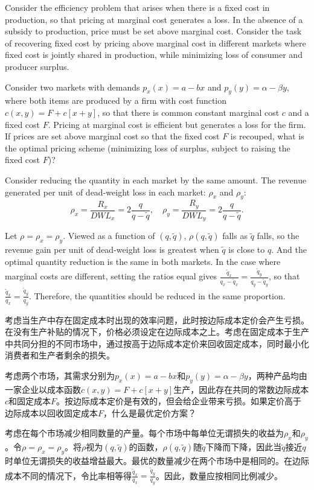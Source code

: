 \begin{original}
Consider the efficiency problem that arises when there is a fixed cost in production, so that pricing at marginal cost generates a loss. In the absence of a subsidy to production, price must be set above marginal cost. Consider the task of recovering fixed cost by pricing above marginal cost in different markets where fixed cost is jointly shared in production, while minimizing loss of consumer and producer surplus.

Consider two markets with demands $p_x(x) = a - bx$ and $p_y(y) = \alpha - \beta y$, where both items are produced by a firm with cost function $c(x, y) = F + c[x + y]$, so that there is common constant marginal cost $c$ and a fixed cost $F$. Pricing at marginal cost is efficient but generates a loss for the firm. If prices are set above marginal cost so that the fixed cost $F$ is recouped, what is the optimal pricing scheme (minimizing loss of surplus, subject to raising the fixed cost $F$)?

Consider reducing the quantity in each market by the same amount. The revenue generated per unit of dead-weight loss in each market: $\rho_x$ and $\rho_y$:
\[
\rho_x = \frac{R_x}{DWL_x} = 2\frac{q}{q - \tilde{q}}, \quad \rho_y = \frac{R_y}{DWL_y} = 2\frac{q}{q - \tilde{q}}.
\]

Let $\rho = \rho_x = \rho_y$. Viewed as a function of $(q, \tilde{q})$, $\rho(q, \tilde{q})$ falls as $\tilde{q}$ falls, so the revenue gain per unit of dead-weight loss is greatest when $\tilde{q}$ is close to $q$. And the optimal quantity reduction is the same in both markets. In the case where marginal costs are different, setting the ratios equal gives $\frac{\tilde{q}_x}{q_x - \tilde{q}_x} = \frac{\tilde{q}_y}{q_y - \tilde{q}_y}$, so that $\frac{\tilde{q}_x}{q_x} = \frac{\tilde{q}_y}{q_y}$. Therefore, the quantities should be reduced in the same proportion.
\end{original}
\begin{translation}
考虑当生产中存在固定成本时出现的效率问题，此时按边际成本定价会产生亏损。在没有生产补贴的情况下，价格必须设定在边际成本之上。考虑在固定成本于生产中共同分担的不同市场中，通过按高于边际成本定价来回收固定成本，同时最小化消费者和生产者剩余的损失。

考虑两个市场，其需求分别为$p_x(x) = a - bx$和$p_y(y) = \alpha - \beta y$，两种产品均由一家企业以成本函数$c(x, y) = F + c[x + y]$生产，因此存在共同的常数边际成本$c$和固定成本$F$。按边际成本定价是有效的，但会给企业带来亏损。如果定价高于边际成本以回收固定成本$F$，什么是最优定价方案？

考虑在每个市场减少相同数量的产量。每个市场中每单位无谓损失的收益为$\rho_x$和$\rho_y$。令$\rho = \rho_x = \rho_y$。将$\rho$视为$(q, \tilde{q})$的函数，$\rho(q, \tilde{q})$随$\tilde{q}$下降而下降，因此当$\tilde{q}$接近$q$时单位无谓损失的收益增益最大。最优的数量减少在两个市场中是相同的。在边际成本不同的情况下，令比率相等得$\frac{\tilde{q}_x}{q_x} = \frac{\tilde{q}_y}{q_y}$。因此，数量应按相同比例减少。
\end{translation}

